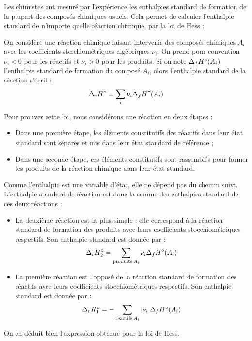 \documentclass[11pt,fleqn]{book} %
\begin{document}
Les chimistes ont mesuré par l'expérience les enthalpies standard de formation de la plupart des composés chimiques usuels. Cela permet de calculer l'enthalpie standard de n'importe quelle réaction chimique, par la loi de Hess :
\begin{theorem}
    On considère une réaction chimique faisant intervenir des composés chimiques $A_i$ avec les coefficients stœchiométriques algébriques $\nu_i$. On prend pour convention $\nu_i <0$ pour les réactifs et $\nu_i>0$ pour les produits. Si on note $\Delta_fH\degree(A_i)$ l'enthalpie standard de formation du composé $A_i$, alors l'enthalpie standard de la réaction s'écrit :
    \begin{equation}
        \Delta_r H \degree = \sum_i \nu_i \Delta_f H\degree(A_i)
    \end{equation}
\end{theorem}
\begin{demonstration}
    Pour prouver cette loi, nous considérons une réaction en deux étapes :
    \begin{itemize}
        \item Dans une première étape, les éléments constitutifs des réactifs dans leur état standard sont séparés et mis dans leur état standard de référence ;
        \item Dans une seconde étape, ces éléments constitutifs sont rassemblés pour former les produits de la réaction chimique dans leur état standard.
    \end{itemize}

    Comme l'enthalpie est une variable d'état, elle ne dépend pas du chemin suivi. L'enthalpie standard de réaction est donc la somme des enthalpies standard de ces deux réactions :
    \begin{itemize}
        \item La deuxième réaction est la plus simple : elle correspond à la réaction standard de formation des produits avec leurs coefficients stoechiométriques respectifs. Son enthalpie standard est donnée par :
        \begin{equation}
            \Delta_r H\degree_2 = \sum_{\mathrm{produits}\,A_i} \nu_i \Delta_f H\degree(A_i)
        \end{equation}
        \item La première réaction est l'opposé de la réaction standard de formation des réactifs avec leurs coefficients stoechiométriques respectifs. Son enthalpie standard est donnée par :
        \begin{equation}
            \Delta_r H\degree_1 = - \sum_{\mathrm{reactifs}\,A_i} |\nu_i|\Delta_f H\degree(A_i)
        \end{equation}
    \end{itemize}
    On en déduit bien l'expression obtenue pour la loi de Hess.
\end{demonstration}
\end{document}
